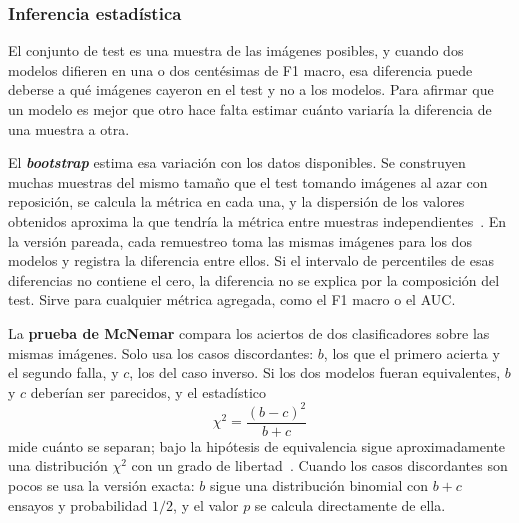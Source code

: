 \subsubsection{Inferencia estadística}
\label{sec:marco_eval_estadistica}

El conjunto de test es una muestra de las imágenes posibles, y cuando dos modelos difieren en una o dos
centésimas de F1 macro, esa diferencia puede deberse a qué imágenes cayeron en el test y no a los modelos.
Para afirmar que un modelo es mejor que otro hace falta estimar cuánto variaría la diferencia de una muestra
a otra.

El \textbf{\emph{bootstrap}} estima esa variación con los datos disponibles. Se construyen muchas muestras del
mismo tamaño que el test tomando imágenes al azar con reposición, se calcula la métrica en cada una, y la
dispersión de los valores obtenidos aproxima la que tendría la métrica entre muestras
independientes~\cite{efron1979bootstrap}. En la versión pareada, cada remuestreo toma las mismas imágenes para
los dos modelos y registra la diferencia entre ellos. Si el intervalo de percentiles de esas diferencias no
contiene el cero, la diferencia no se explica por la composición del test. Sirve para cualquier métrica
agregada, como el F1 macro o el AUC.

\begingroup La \textbf{prueba de McNemar} compara los aciertos de dos clasificadores sobre las mismas imágenes.
Solo usa los casos discordantes: $b$, los que el primero acierta y el segundo falla, y $c$, los del caso
inverso. Si los dos modelos fueran equivalentes, $b$ y $c$ deberían ser parecidos, y el
estadístico
\begin{equation}
    \chi^2 = \frac{(b-c)^2}{b+c}
    \label{eq:marco_mcnemar}
\end{equation}
mide cuánto se separan; bajo la hipótesis de equivalencia sigue aproximadamente una distribución $\chi^2$ con
un grado de libertad~\cite{mcnemar1947note}. Cuando los casos discordantes son pocos se usa la versión
exacta: $b$ sigue una distribución binomial con $b+c$ ensayos y probabilidad $1/2$, y el valor $p$ se calcula
directamente de ella.\par\endgroup

